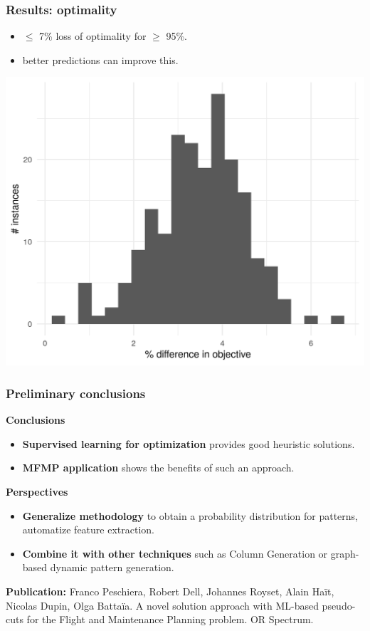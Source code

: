 \begin{frame}
\frametitle{\textbf{Results: optimality}}
  
  \begin{itemize}[<+->]
    \item $\le$ 7\% loss of optimality for $\ge$ 95\%.
    \item better predictions can improve this.
  \end{itemize}

  \includegraphics[width=0.8\linewidth]{images/quality_degradation_2tasks}

\end{frame}

\begin{frame}
\frametitle{\textbf{Preliminary conclusions}}
  \pause
  \begin{block}{\textbf{Conclusions}}
    \begin{itemize}
    \item \textbf{Supervised learning for optimization}
      provides good heuristic solutions.
    \item \textbf{MFMP application}
      shows the benefits of such an approach.
    \end{itemize}
  \end{block}  
  \pause
  \begin{block}{\textbf{Perspectives}}
    \begin{itemize}
      \item \textbf{Generalize methodology}
        to obtain a probability distribution for patterns, automatize feature extraction.
      \item \textbf{Combine it with other techniques}
        such as Column Generation or graph-based dynamic pattern generation.
    \end{itemize}
  \end{block}  
  \pause
  \textbf{Publication:} Franco Peschiera, Robert Dell, Johannes Royset, Alain Haït, Nicolas Dupin, Olga Battaïa. A novel solution approach with ML-based pseudo-cuts for the Flight and Maintenance Planning problem. OR Spectrum.
\end{frame}